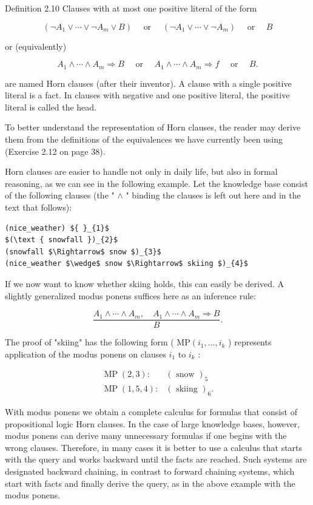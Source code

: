 \documentclass[10pt]{article}
\begin{document}
Definition 2.10 Clauses with at most one positive literal of the form

$$
\left(\neg A_{1} \vee \cdots \vee \neg A_{m} \vee B\right) \quad \text { or } \quad\left(\neg A_{1} \vee \cdots \vee \neg A_{m}\right) \quad \text { or } \quad B
$$

or (equivalently)

$$
A_{1} \wedge \cdots \wedge A_{m} \Rightarrow B \quad \text { or } \quad A_{1} \wedge \cdots \wedge A_{m} \Rightarrow f \quad \text { or } \quad B .
$$

are named Horn clauses (after their inventor). A clause with a single positive literal is a fact. In clauses with negative and one positive literal, the positive literal is called the head.

To better understand the representation of Horn clauses, the reader may derive them from the definitions of the equivalences we have currently been using (Exercise 2.12 on page 38).

Horn clauses are easier to handle not only in daily life, but also in formal reasoning, as we can see in the following example. Let the knowledge base consist of the following clauses (the " $\wedge$ " binding the clauses is left out here and in the text that follows):

\begin{verbatim}
(nice_weather) ${ }_{1}$
$(\text { snowfall })_{2}$
(snowfall $\Rightarrow$ snow $)_{3}$
(nice_weather $\wedge$ snow $\Rightarrow$ skiing $)_{4}$
\end{verbatim}

If we now want to know whether skiing holds, this can easily be derived. A slightly generalized modus ponens suffices here as an inference rule:

$$
\frac{A_{1} \wedge \cdots \wedge A_{m}, \quad A_{1} \wedge \cdots \wedge A_{m} \Rightarrow B}{B} .
$$

The proof of "skiing" has the following form ( $\mathrm{MP}\left(i_{1}, \ldots, i_{k}\right.$ ) represents application of the modus ponens on clauses $i_{1}$ to $i_{k}$ :

$$
\begin{array}{ll}
\operatorname{MP}(2,3): & (\text { snow })_{5} \\
\operatorname{MP}(1,5,4): & (\text { skiing })_{6} .
\end{array}
$$

With modus ponens we obtain a complete calculus for formulas that consist of propositional logic Horn clauses. In the case of large knowledge bases, however, modus ponens can derive many unnecessary formulas if one begins with the wrong clauses. Therefore, in many cases it is better to use a calculus that starts with the query and works backward until the facts are reached. Such systems are designated backward chaining, in contrast to forward chaining systems, which start with facts and finally derive the query, as in the above example with the modus ponens.
\end{document}
